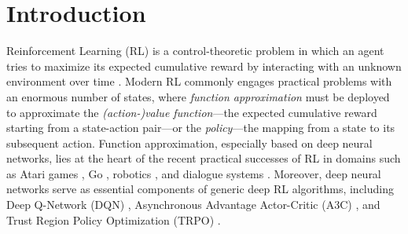 

\section{Introduction}
Reinforcement Learning (RL) is a control-theoretic problem in which an agent tries to maximize
its expected cumulative reward by interacting with an unknown environment over time \cite{sutton2011reinforcement}.
Modern RL commonly engages practical problems with an enormous number of states, where \emph{function approximation}
must be deployed to approximate the \emph{(action-)value function}---the expected cumulative reward
starting from a state-action pair---or the \emph{policy}---the mapping from a state to its subsequent action. Function approximation, especially based on deep neural networks, lies at the heart of the recent practical successes of RL in domains such as Atari games \cite{mnih2013playing}, Go \cite{silver2016mastering}, robotics \cite{kober2012reinforcement}, and dialogue systems \cite{li2016deep}. Moreover, deep neural networks serve as essential components of generic deep RL algorithms, including Deep Q-Network (DQN) \cite{mnih2013playing}, Asynchronous Advantage Actor-Critic (A3C) \cite{mnih2016asynchronous}, and Trust Region Policy Optimization (TRPO) \cite{schulman2015trust}.


